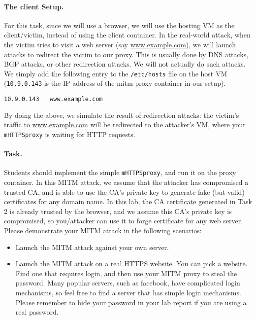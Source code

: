 \paragraph{The client Setup.} 
For this task, since we will use a browser, we will 
use the hosting VM as the client/victim, instead of using 
the client container. 
In the real-world attack, when the victim tries to visit
a web server (say \url{www.example.com}), we will launch attacks to redirect
the victim to our proxy. This is usually done by DNS attacks, BGP attacks, or other 
redirection attacks. We will not actually do such attacks. We simply 
add the following entry to the \texttt{/etc/hosts} file on the host VM (\texttt{10.9.0.143} 
is the IP address of the mitm-proxy container in our setup). 

\begin{lstlisting}
10.9.0.143   www.example.com
\end{lstlisting}

By doing the above, we simulate the result of redirection attacks:
the victim's traffic to \url{www.example.com} 
will be redirected to the attacker's VM, where your \texttt{mHTTPSproxy} 
is waiting for HTTP requests. 
 

\paragraph{Task.} Students should implement the simple \texttt{mHTTPSproxy},
and run it on the proxy container. 
In this MITM attack, we assume that the attacker has compromised a trusted CA, and is 
able to use the CA's private key to generate fake (but valid) certificates for any
domain name. In this lab, the CA certificate generated in Task 2
is already trusted by the browser, and we assume this CA's private key
is compromised, so you/attacker can use it to forge certificate for any web server. 
Please demonstrate your MITM attack in the following scenarios:


\begin{itemize}

\item Launch the MITM attack against your own server. 

\item Launch the MITM attack on a real HTTPS website. You can pick 
a website. Find one that requires login, and then use your MITM proxy to 
steal the password. Many popular servers, such as facebook, have complicated 
login mechanisms, so feel free to find a server that has simple login mechanisms. 
Please remember to hide your password in your lab report if you 
are using a real password. 
\end{itemize}



